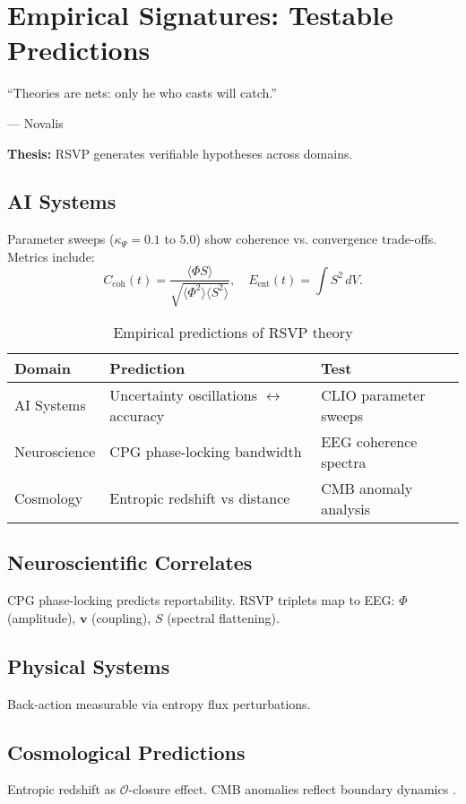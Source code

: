 \documentclass[12pt]{book}
\theoremstyle{definition}
\begin{document}
\chapter{Empirical Signatures: Testable Predictions}
\label{chap:empirical}
\epigraph{``Theories are nets: only he who casts will catch.''}{--- Novalis}

\textbf{Thesis:} RSVP generates verifiable hypotheses across domains.

\section{AI Systems}
Parameter sweeps (\(\kappa_\Psi = 0.1\) to \(5.0\)) show coherence vs. convergence trade-offs. Metrics include:
\begin{equation}
C_{\text{coh}}(t) = \frac{\langle \Phi S \rangle}{\sqrt{\langle \Phi^2 \rangle \langle S^2 \rangle}}, \quad E_{\text{ent}}(t) = \int S^2 \, dV.
\end{equation}

\begin{table}[h]
\centering
\begin{tabular}{lll}
\hline
\textbf{Domain} & \textbf{Prediction} & \textbf{Test} \\
\hline
AI Systems & Uncertainty oscillations \(\leftrightarrow\) accuracy & CLIO parameter sweeps \\
Neuroscience & CPG phase-locking bandwidth & EEG coherence spectra \\
Cosmology & Entropic redshift vs distance & CMB anomaly analysis \\
\hline
\end{tabular}
\caption{Empirical predictions of RSVP theory}
\label{tab:empirical}
\end{table}

\section{Neuroscientific Correlates}
CPG phase-locking predicts reportability. RSVP triplets map to EEG: \(\Phi\) (amplitude), \(\mathbf{v}\) (coupling), \(S\) (spectral flattening).

\section{Physical Systems}
Back-action measurable via entropy flux perturbations.

\section{Cosmological Predictions}
Entropic redshift as \(\mathcal{O}\)-closure effect. CMB anomalies reflect boundary dynamics \cite{gibbs2025entropic}.
\end{document}

